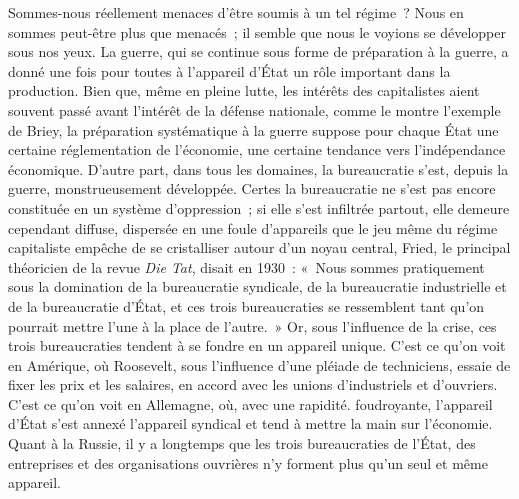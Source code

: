 \documentclass[french,twoside]{book} %
\begin{document}
Sommes-nous réellement menaces d'être soumis à un tel régime ? Nous en sommes peut-être plus que menacés ; il semble que nous le voyions se développer sous nos yeux. La guerre, qui se continue sous forme de préparation à la guerre, a donné une fois pour toutes à l'appareil d'État un rôle important dans la production. Bien que, même en pleine lutte, les intérêts des capitalistes aient souvent passé avant l'intérêt de la défense nationale, comme le montre l'exemple de Briey, la préparation systématique à la guerre suppose pour chaque État une certaine réglementation de l'économie, une certaine tendance vers l'indépendance économique. D'autre part, dans tous les domaines, la bureaucratie s'est, depuis la guerre, monstrueusement développée. Certes la bureaucratie ne s'est pas encore constituée en un système d'oppression ; si elle s'est infiltrée partout, elle demeure cependant diffuse, dispersée en une foule d'appareils que le jeu même du régime capitaliste empêche de se cristalliser autour d'un noyau central, Fried, le principal théoricien de la revue {\itshape Die Tat}, disait en 1930 : « Nous sommes pratiquement sous la domination de la bureaucratie syndicale, de la bureaucratie industrielle et de la bureaucratie d'État, et ces trois bureaucraties se ressemblent tant qu'on pourrait mettre l'une à la place de l'autre. » Or, sous l'influence de la crise, ces trois bureaucraties tendent à se fondre en un appareil unique. C'est ce qu'on voit en Amérique, où Roosevelt, sous l'influence d'une pléiade de techniciens, essaie de fixer les prix et les salaires, en accord avec les unions d'industriels et d'ouvriers. C'est ce qu'on voit en Allemagne, où, avec une rapidité. foudroyante, l'appareil d'État s'est annexé l'appareil syndical et tend à mettre la main sur l'économie. Quant à la Russie, il y a longtemps que les trois bureaucraties de l'État, des entreprises et des organisations ouvrières n'y forment plus qu'un seul et même appareil.\par
\end{document}
